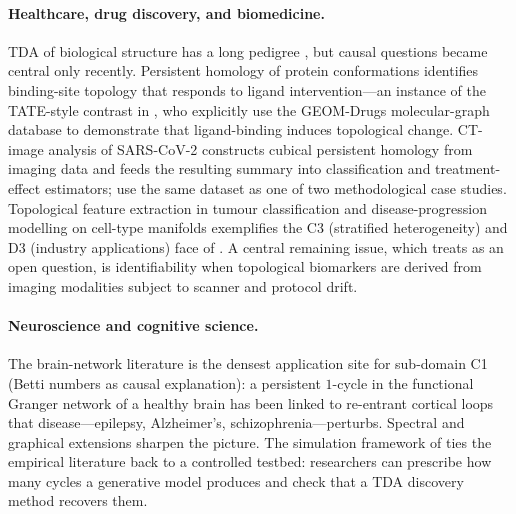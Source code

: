 \paragraph{Healthcare, drug discovery, and biomedicine.}
TDA of biological structure has a long pedigree \citep{kasson2007persistent,
chung2009persistence}, but causal questions became central only
recently. Persistent homology of protein conformations
\citep{kovacev2016using,cang2018integration} identifies binding-site
topology that responds to ligand intervention---an instance of the
TATE-style contrast in \citet{kim2026topological}, who explicitly use
the GEOM-Drugs molecular-graph database \citep{axelrod2022geom} to
demonstrate that ligand-binding induces topological change. CT-image
analysis of SARS-CoV-2 \citep{soares2020sars,iqbal2025classification}
constructs cubical persistent homology from imaging data and feeds the
resulting summary into classification and treatment-effect estimators;
\citet{kim2026topological} use the same dataset as one of two
methodological case studies. Topological feature extraction in tumour
classification \citep{iqbal2025classification} and disease-progression
modelling on cell-type manifolds
\citep{kim2018topological,carlsson2020topological,corcoran2023topological}
exemplifies the C3 (stratified heterogeneity) and D3 (industry
applications) face of . A central remaining issue,
which  treats as an open question, is identifiability
when topological biomarkers are derived from imaging modalities subject
to scanner and protocol drift.

\paragraph{Neuroscience and cognitive science.}
The brain-network literature \citep{bullmore2009complex,bassett2009human,
sporns2013structure,muldoon2016small,sizemore2018cliques,
sizemore2019importance,fathian2022trend} is the densest application
site for sub-domain C1 (Betti numbers as causal explanation): a
persistent $1$-cycle in the functional Granger network of a healthy
brain has been linked to re-entrant cortical loops that
disease---epilepsy, Alzheimer's, schizophrenia---perturbs. Spectral and
graphical extensions \citep{ombao2022spectral,gorrostieta2018time}
sharpen the picture. The simulation framework of
\citet{elyaagoubi2023statistical} ties the empirical literature back to
a controlled testbed: researchers can prescribe how many cycles a
generative model produces and check that a TDA discovery method
recovers them.

